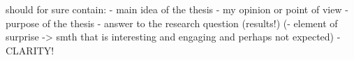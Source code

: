 \chapter{\abstractname}


should for sure contain:
- main idea of the thesis
- my opinion or point of view
- purpose of the thesis
- answer to the research question (results!)
(- element of surprise -> smth that is interesting and engaging and perhaps not expected)
- CLARITY!

